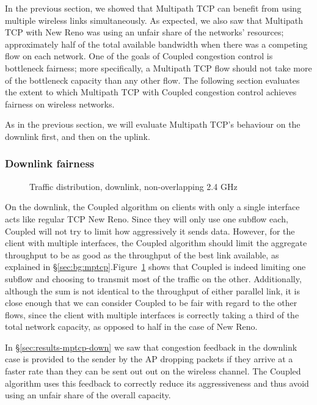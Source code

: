 In the previous section, we showed that Multipath TCP can benefit from
using multiple wireless links simultaneously. As expected, we also saw that
Multipath TCP with New Reno was using an unfair share of the networks'
resources; approximately half of the total available bandwidth when there was a
competing flow on each network. One of the goals of Coupled congestion 
control is bottleneck fairness; more specifically, a 
Multipath TCP flow should not take more of the bottleneck capacity than any 
other flow. The following section evaluates the extent to which Multipath TCP with 
Coupled congestion control achieves fairness on wireless networks.

As in the previous section, we will evaluate Multipath TCP's behaviour on the
downlink first, and then on the uplink.

\subsubsection{Downlink fairness}

\begin{figure}[h]
 \centering
 
 \caption{Traffic distribution, downlink, non-overlapping 2.4 GHz}\label{graph:down-fair}
\end{figure}

On the downlink, the Coupled algorithm on clients with only a single
interface acts like regular TCP New Reno. Since they will only use one subflow
each, Coupled will not try to limit how aggressively it sends data. However, for
the client with multiple interfaces, the Coupled algorithm should limit the
aggregate throughput to be as good as the throughput of the best link
available, as explained in \S\ref{sec:bg:mptcp}.\@ Figure~\ref{graph:down-fair}
shows that Coupled is indeed limiting one subflow and choosing to transmit most
of the traffic on the other.  Additionally, although the sum is not identical to
the throughput of either parallel link, it is close enough that we can consider
Coupled to be fair with regard to the other flows, since the
client with multiple interfaces is correctly taking a third of the total network
capacity, as opposed to half in the case of New Reno.


In \S\ref{sec:results-mptcp-down} we saw that congestion feedback in the 
downlink case is provided to the sender by the AP dropping packets if they
arrive at a faster rate than they can be sent out out on the wireless channel. The
Coupled algorithm uses this feedback to correctly reduce its aggressiveness and 
thus avoid using an unfair share of the overall capacity.

